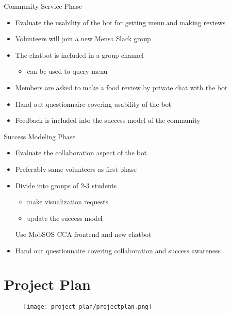 \begin{frame}{Community Service Phase}
  \begin{itemize}
    \item Evaluate the usability of the bot for getting menu and making reviews
    \item Volunteers will join a new Mensa Slack group
    \item The chatbot is included in a group channel
          \begin{itemize}
            \item can be used to query menu
          \end{itemize}
    \item Members are asked to make a food review by private chat with the bot
    \item Hand out questionnaire covering usability of the bot
    \item Feedback is included into the success model of the community
  \end{itemize}
\end{frame}

\begin{frame}{Success Modeling Phase}
  \begin{itemize}
    \item Evaluate the collaboration aspect of the bot
    \item Preferably same volunteers as first phase %
    \item Divide into groups of 2-3 students
          \begin{itemize}
            \item make visualization requests
            \item update the success model
          \end{itemize}
          Use MobSOS CCA frontend and new chatbot
    \item Hand out questionnaire covering collaboration and success awareness
  \end{itemize}
\end{frame}

\section{Project Plan}
\begin{frame}
  \begin{figure}
    \centering
    \texttt{[image: project\_plan/projectplan.png]}
  \end{figure}
\end{frame}